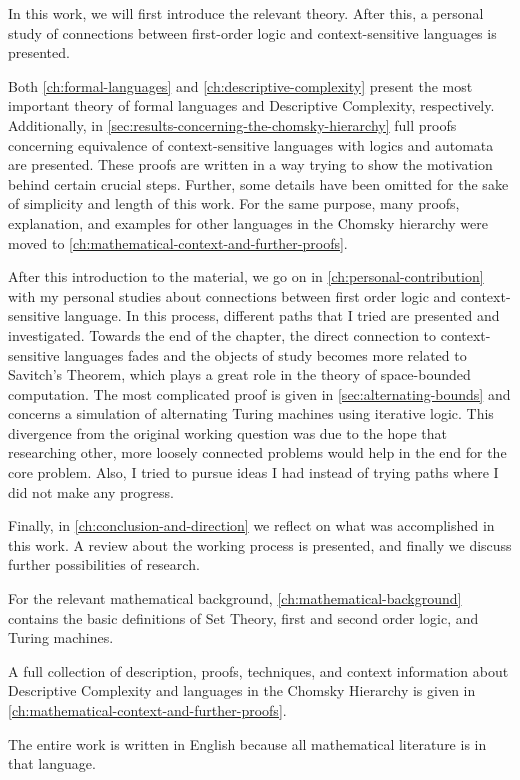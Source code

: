 In this work, we will first introduce the relevant theory.
After this, a personal study of connections between first-order logic and context-sensitive languages is presented.

Both \cref{ch:formal-languages} and \cref{ch:descriptive-complexity} present the most important theory of formal languages and Descriptive Complexity, respectively.
Additionally, in \cref{sec:results-concerning-the-chomsky-hierarchy} full proofs concerning equivalence of context-sensitive languages with logics and automata are presented.
These proofs are written in a way trying to show the motivation behind certain crucial steps.
Further, some details have been omitted for the sake of simplicity and length of this work.
For the same purpose, many proofs, explanation, and examples for other languages in the Chomsky hierarchy were moved to \cref{ch:mathematical-context-and-further-proofs}.

After this introduction to the material, we go on in \cref{ch:personal-contribution} with my personal studies about connections between first order logic and context-sensitive language.
In this process, different paths that I tried are presented and investigated.
Towards the end of the chapter, the direct connection to context-sensitive languages fades and the objects of study becomes more related to Savitch's Theorem, which plays a great role in the theory of space-bounded computation.
The most complicated proof is given in \cref{sec:alternating-bounds} and concerns a simulation of alternating Turing machines using iterative logic.
This divergence from the original working question was due to the hope that researching other, more loosely connected problems would help in the end for the core problem.
Also, I tried to pursue ideas I had instead of trying paths where I did not make any progress.

Finally, in \cref{ch:conclusion-and-direction} we reflect on what was accomplished in this work.
A review about the working process is presented, and finally we discuss further possibilities of research.

For the relevant mathematical background, \cref{ch:mathematical-background} contains the basic definitions of Set Theory, first and second order logic, and Turing machines.

A full collection of description, proofs, techniques, and context information about Descriptive Complexity and languages in the Chomsky Hierarchy is given in \cref{ch:mathematical-context-and-further-proofs}.

The entire work is written in English because all mathematical literature is in that language.